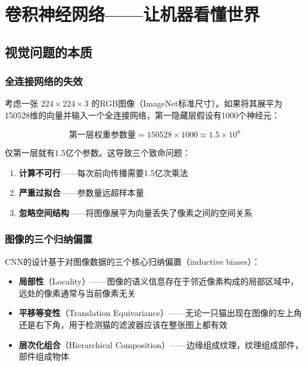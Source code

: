 
\chapter{卷积神经网络——让机器看懂世界}


\section{视觉问题的本质}

\subsection{全连接网络的失效}

考虑一张 $224 \times 224 \times 3$ 的RGB图像（ImageNet标准尺寸）。如果将其展平为150528维的向量并输入一个全连接网络，第一隐藏层假设有1000个神经元：

\[
\text{第一层权重参数量} = 150528 \times 1000 \approx 1.5 \times 10^8
\]

仅第一层就有1.5亿个参数。这导致三个致命问题：
\begin{enumerate}
    \item \textbf{计算不可行}——每次前向传播需要1.5亿次乘法
    \item \textbf{严重过拟合}——参数量远超样本量
    \item \textbf{忽略空间结构}——将图像展平为向量丢失了像素之间的空间关系
\end{enumerate}

\subsection{图像的三个归纳偏置}

CNN的设计基于对图像数据的三个核心归纳偏置（inductive biases）：

\begin{itemize}
    \item \textbf{局部性}（Locality）——图像的语义信息存在于邻近像素构成的局部区域中，远处的像素通常与当前像素无关
    \item \textbf{平移等变性}（Translation Equivariance）——无论一只猫出现在图像的左上角还是右下角，用于检测猫的滤波器应该在整张图上都有效
    \item \textbf{层次化组合}（Hierarchical Composition）——边缘组成纹理，纹理组成部件，部件组成物体
\end{itemize}

